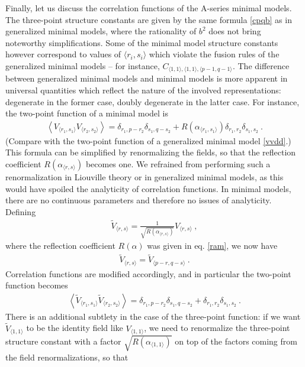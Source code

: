 \documentclass[12pt, a4paper, notitlepage, twoside]{report}
\numberwithin{equation}{section}
\theoremstyle{break}
\begin{document}
Finally, let us discuss the correlation functions of the A-series minimal models.
The three-point structure constants are given by the same formula \eqref{cpqb} as in generalized minimal models, where the rationality of $b^2$ does not bring noteworthy simplifications. 
Some of the minimal model structure constants however correspond to values of $\langle r_i,s_i\rangle$ which violate the fusion rules of the generalized minimal models -- for instance, $C_{\langle 1,1\rangle,\langle 1,1\rangle,\langle p-1,q-1\rangle}$. 
The difference between generalized minimal models and minimal models is more apparent in universal quantities which reflect the nature of the involved representations: degenerate in the former case, doubly degenerate in the latter case.
For instance, the two-point function of a minimal model is 
\begin{align}
 \left\langle V_{\langle r_1,s_1 \rangle} V_{\langle r_2,s_2 \rangle} \right\rangle = \delta_{r_1,p-r_2}\delta_{s_1,q-s_2} + R(\alpha_{\langle r_1,s_1 \rangle}) \delta_{r_1,r_2} \delta_{s_1,s_2} \ .
\label{vvddp}
\end{align}
(Compare with the two-point function of a generalized minimal model \eqref{vvdd}.) This formula can be simplified by renormalizing the fields, so that the reflection coefficient $R(\alpha_{\langle r,s\rangle})$ becomes one.
We refrained from performing such a renormalization in Liouville theory or in generalized minimal models, as this would have spoiled the analyticity of correlation functions.
In minimal models, there are no continuous parameters and therefore no issues of analyticity.
Defining
\begin{align}
 \boxed{\tilde{V}_{\langle r,s \rangle} = \frac{1}{\sqrt{R(\alpha_{\langle r,s \rangle})}} V_{\langle r,s \rangle}}\ , 
\end{align}
where the reflection coefficient $R(\alpha)$ was given in eq. \eqref{ram}, we now have 
\begin{align}
 \tilde{V}_{\langle r,s \rangle} = \tilde{V}_{\langle p-r,q-s \rangle}\ .
\end{align}
Correlation functions are modified accordingly, and in particular the two-point function becomes
\begin{align}
 \boxed{\left\langle \tilde{V}_{\langle r_1,s_1 \rangle} \tilde{V}_{\langle r_2,s_2 \rangle} \right\rangle = \delta_{r_1,p-r_2}\delta_{s_1,q-s_2} + \delta_{r_1,r_2} \delta_{s_1,s_2}} \ .
\end{align}
There is an additional subtlety in the case of the three-point function: if we want $\tilde{V}_{\langle 1,1 \rangle}$ to be the identity field like $V_{\langle 1,1 \rangle}$, we need to renormalize the three-point structure constant with a factor $\sqrt{R(\alpha_{\langle 1,1 \rangle})}$ on top of the factors coming from the field renormalizations, so that 
\end{document}
